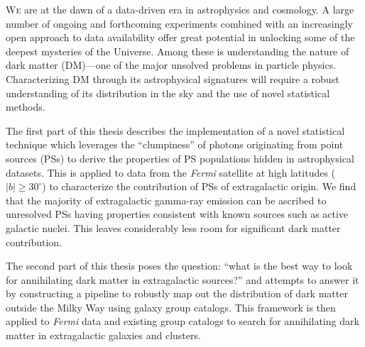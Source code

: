 \lettrine[lines=3]{W}{e} are at the dawn of a data-driven era in astrophysics and cosmology. A large number of ongoing and forthcoming experiments combined with an increasingly open approach to data availability offer great potential in unlocking some of the deepest mysteries of the Universe. Among these is understanding the nature of dark matter (DM)---one of the major unsolved problems in particle physics. Characterizing DM through its astrophysical signatures will require a robust understanding of its distribution in the sky and the use of novel statistical methods. 

The first part of this thesis describes the implementation of a novel statistical technique which leverages the ``clumpiness'' of photons originating from point sources (PSs) to derive the properties of PS populations hidden in astrophysical datasets. This is applied to data from the \emph{Fermi} satellite at high latitudes ($|b|\geq 30^\circ$) to characterize the contribution of PSs of extragalactic origin. We find that the majority of extragalactic gamma-ray emission can be ascribed to unresolved PSs having properties consistent with known sources such as active galactic nuclei. This leaves considerably less room for significant dark matter contribution.

The second part of this thesis poses the question: ``what is the best way to look for annihilating dark matter in extragalactic sources?'' and attempts to answer it by constructing a pipeline to robustly map out the distribution of dark matter outside the Milky Way using galaxy group catalogs. This framework is then applied to \emph{Fermi} data and existing group catalogs to search for annihilating dark matter in extragalactic galaxies and clusters.
